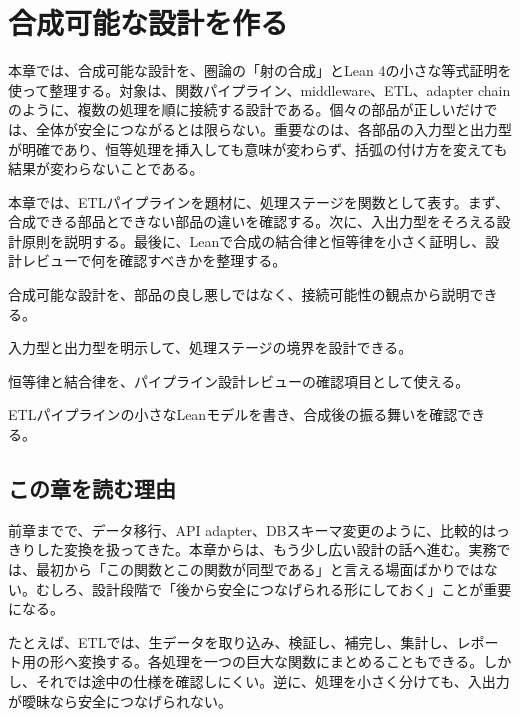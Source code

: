 \chapter{合成可能な設計を作る}
\label{chap:composable-design}

\begin{chapterabstract}
本章では、合成可能な設計を、圏論の「射の合成」とLean 4の小さな等式証明を使って整理する。対象は、関数パイプライン、middleware、ETL、adapter chain のように、複数の処理を順に接続する設計である。個々の部品が正しいだけでは、全体が安全につながるとは限らない。重要なのは、各部品の入力型と出力型が明確であり、恒等処理を挿入しても意味が変わらず、括弧の付け方を変えても結果が変わらないことである。

本章では、ETLパイプラインを題材に、処理ステージを関数として表す。まず、合成できる部品とできない部品の違いを確認する。次に、入出力型をそろえる設計原則を説明する。最後に、Leanで合成の結合律と恒等律を小さく証明し、設計レビューで何を確認すべきかを整理する。
\end{chapterabstract}

\begin{learninggoals}
\item 合成可能な設計を、部品の良し悪しではなく、接続可能性の観点から説明できる。
\item 入力型と出力型を明示して、処理ステージの境界を設計できる。
\item 恒等律と結合律を、パイプライン設計レビューの確認項目として使える。
\item ETLパイプラインの小さなLeanモデルを書き、合成後の振る舞いを確認できる。
\end{learninggoals}

\section{この章を読む理由}

前章までで、データ移行、API adapter、DBスキーマ変更のように、比較的はっきりした変換を扱ってきた。本章からは、もう少し広い設計の話へ進む。実務では、最初から「この関数とこの関数が同型である」と言える場面ばかりではない。むしろ、設計段階で「後から安全につなげられる形にしておく」ことが重要になる。

たとえば、ETLでは、生データを取り込み、検証し、補完し、集計し、レポート用の形へ変換する。各処理を一つの巨大な関数にまとめることもできる。しかし、それでは途中の仕様を確認しにくい。逆に、処理を小さく分けても、入出力が曖昧なら安全につなげられない。


